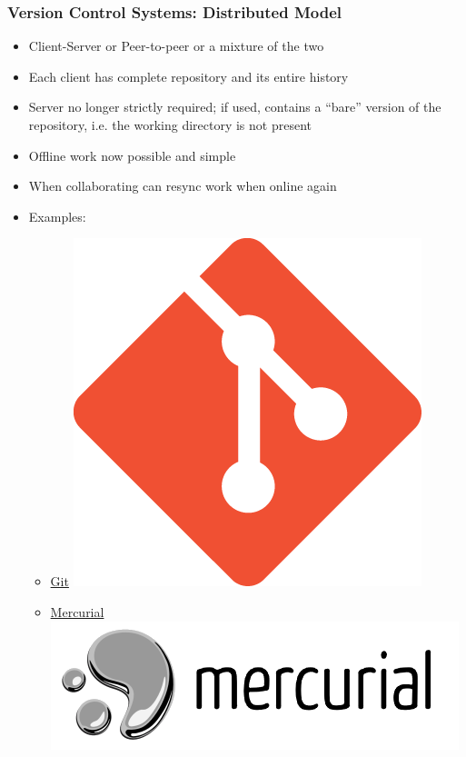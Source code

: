 \begin{frame}
\frametitle{Version Control Systems: Distributed Model}
\begin{itemize}
    \item Client-Server or Peer-to-peer or a mixture of the two
    \item Each client has complete repository and its entire history
    \item Server no longer strictly required; if used, contains a ``bare''
        version of the repository, i.e. the working directory is not present
    \item Offline work now possible and simple
    \item When collaborating can resync work when online again
    \item Examples:
        \begin{itemize}
            \item \href{https://git-scm.com/}{Git}
                \includegraphics[height=0.05\textheight]{images/git_logo.png}
            \item \href{https://www.mercurial-scm.org/}{Mercurial}
                \includegraphics[height=0.05\textheight]{images/mercurial_logo.png}
        \end{itemize}
\end{itemize}
\end{frame}

